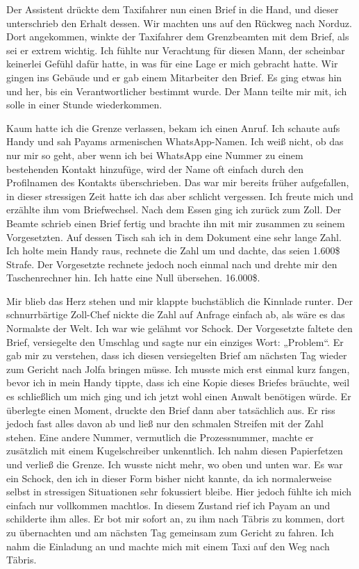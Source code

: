 Der Assistent drückte dem Taxifahrer nun einen Brief in die Hand, und dieser unterschrieb den Erhalt dessen. Wir machten uns auf den Rückweg nach Norduz. Dort angekommen, winkte der Taxifahrer dem Grenzbeamten mit dem Brief, als sei er extrem wichtig. Ich fühlte nur Verachtung für diesen Mann, der scheinbar keinerlei Gefühl dafür hatte, in was für eine Lage er mich gebracht hatte. Wir gingen ins Gebäude und er gab einem Mitarbeiter den Brief. Es ging etwas hin und her, bis ein Verantwortlicher bestimmt wurde. Der Mann teilte mir mit, ich solle in einer Stunde wiederkommen.

Kaum hatte ich die Grenze verlassen, bekam ich einen Anruf. Ich schaute aufs Handy und sah Payams armenischen WhatsApp-Namen. Ich weiß nicht, ob das nur mir so geht, aber wenn ich bei WhatsApp eine Nummer zu einem bestehenden Kontakt hinzufüge, wird der Name oft einfach durch den Profilnamen des Kontakts überschrieben. Das war mir bereits früher aufgefallen, in dieser stressigen Zeit hatte ich das aber schlicht vergessen. Ich freute mich und erzählte ihm vom Briefwechsel. Nach dem Essen ging ich zurück zum Zoll. Der Beamte schrieb einen Brief fertig und brachte ihn mit mir zusammen zu seinem Vorgesetzten. Auf dessen Tisch sah ich in dem Dokument eine sehr lange Zahl. Ich holte mein Handy raus, rechnete die Zahl um und dachte, das seien 1.600\$ Strafe. Der Vorgesetzte rechnete jedoch noch einmal nach und drehte mir den Taschenrechner hin. Ich hatte eine Null übersehen. 16.000\$.

Mir blieb das Herz stehen und mir klappte buchstäblich die Kinnlade runter. Der schnurrbärtige Zoll-Chef nickte die Zahl auf Anfrage einfach ab, als wäre es das Normalste der Welt. Ich war wie gelähmt vor Schock. Der Vorgesetzte faltete den Brief, versiegelte den Umschlag und sagte nur ein einziges Wort: „Problem“. Er gab mir zu verstehen, dass ich diesen versiegelten Brief am nächsten Tag wieder zum Gericht nach Jolfa bringen müsse. Ich musste mich erst einmal kurz fangen, bevor ich in mein Handy tippte, dass ich eine Kopie dieses Briefes bräuchte, weil es schließlich um mich ging und ich jetzt wohl einen Anwalt benötigen würde. Er überlegte einen Moment, druckte den Brief dann aber tatsächlich aus. Er riss jedoch fast alles davon ab und ließ nur den schmalen Streifen mit der Zahl stehen. Eine andere Nummer, vermutlich die Prozessnummer, machte er zusätzlich mit einem Kugelschreiber unkenntlich. Ich nahm diesen Papierfetzen und verließ die Grenze. Ich wusste nicht mehr, wo oben und unten war. Es war ein Schock, den ich in dieser Form bisher nicht kannte, da ich normalerweise selbst in stressigen Situationen sehr fokussiert bleibe. Hier jedoch fühlte ich mich einfach nur vollkommen machtlos. In diesem Zustand rief ich Payam an und schilderte ihm alles. Er bot mir sofort an, zu ihm nach Täbris zu kommen, dort zu übernachten und am nächsten Tag gemeinsam zum Gericht zu fahren. Ich nahm die Einladung an und machte mich mit einem Taxi auf den Weg nach Täbris.

